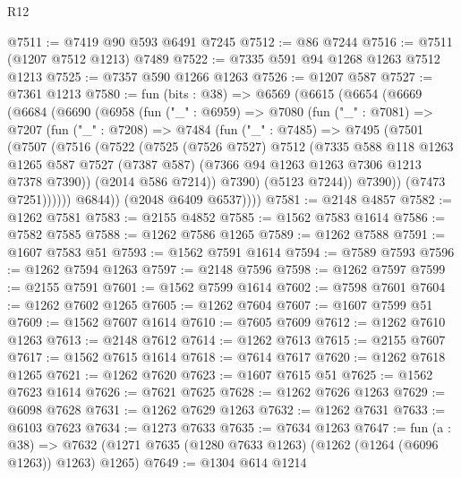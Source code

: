 \begin{lexlean}{R12}
\begin{coremodule}
@7511 := @7419 @90 @593 @6491 @7245
@7512 := @86 @7244
@7516 := @7511 (@1207 @7512 @1213) @7489
@7522 := @7335 @591 @94 @1268 @1263 @7512 @1213
@7525 := @7357 @590 @1266 @1263
@7526 := @1207 @587
@7527 := @7361 @1213
@7580 := fun (bits : @38) =>
  @6569
    (@6615
      (@6654
        (@6669
          (@6684
            (@6690
              (@6958
                (fun ("_" : @6959) =>
                @7080
                  (fun ("_" : @7081) =>
                  @7207
                    (fun ("_" : @7208) =>
                    @7484
                      (fun ("_" : @7485) =>
                      @7495
                        (@7501
                          (@7507
                            (@7516
                              (@7522
                                (@7525
                                  (@7526 @7527)
                                  @7512
                                  (@7335
                                    @588
                                    @118
                                    @1263
                                    @1265
                                    @587
                                    @7527
                                    (@7387 @587)
                                    (@7366 @94 @1263 @1263 @7306 @1213 @7378 @7390))
                                  (@2014 @586 @7214))
                                @7390)
                              (@5123 @7244))
                            @7390))
                        (@7473 @7251))))))
              @6844))
          (@2048 @6409 @6537))))
@7581 := @2148 @4857
@7582 := @1262 @7581
@7583 := @2155 @4852
@7585 := @1562 @7583 @1614
@7586 := @7582 @7585
@7588 := @1262 @7586 @1265
@7589 := @1262 @7588
@7591 := @1607 @7583 @51
@7593 := @1562 @7591 @1614
@7594 := @7589 @7593
@7596 := @1262 @7594 @1263
@7597 := @2148 @7596
@7598 := @1262 @7597
@7599 := @2155 @7591
@7601 := @1562 @7599 @1614
@7602 := @7598 @7601
@7604 := @1262 @7602 @1265
@7605 := @1262 @7604
@7607 := @1607 @7599 @51
@7609 := @1562 @7607 @1614
@7610 := @7605 @7609
@7612 := @1262 @7610 @1263
@7613 := @2148 @7612
@7614 := @1262 @7613
@7615 := @2155 @7607
@7617 := @1562 @7615 @1614
@7618 := @7614 @7617
@7620 := @1262 @7618 @1265
@7621 := @1262 @7620
@7623 := @1607 @7615 @51
@7625 := @1562 @7623 @1614
@7626 := @7621 @7625
@7628 := @1262 @7626 @1263
@7629 := @6098 @7628
@7631 := @1262 @7629 @1263
@7632 := @1262 @7631
@7633 := @6103 @7623
@7634 := @1273 @7633
@7635 := @7634 @1263
@7647 := fun (a : @38) =>
  @7632 (@1271 @7635 (@1280 @7633 @1263) (@1262 (@1264 (@6096 @1263)) @1263) @1265)
@7649 := @1304 @614 @1214

\end{coremodule}
\end{lexlean}
